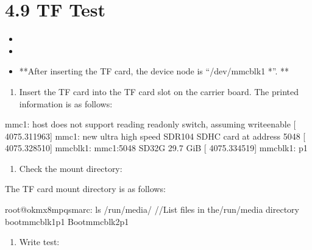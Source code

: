 \documentclass[letterpaper,10pt,openany,english]{sphinxmanual}
\begin{document}
\section{4.9 TF Test}
\label{\detokenize{linux-manual:tf-test}}
\sphinxAtStartPar
{}
\begin{itemize}
\item {} 
\sphinxAtStartPar
{}

\item {} 
\sphinxAtStartPar
{}

\item {} 
\sphinxAtStartPar
**After inserting the TF card, the device node is “/dev/mmcblk1 *”. **

\end{itemize}
\begin{enumerate}
%
\item {} 
\sphinxAtStartPar
Insert the TF card into the TF card slot on the carrier board. The printed information is as follows:

\end{enumerate}

\begin{sphinxVerbatim}[commandchars=\\\{\}]
[ 4075.276047] mmc1: host does not support reading read\PYGZhy{}only switch, assuming write\PYGZhy{}enable
[ 4075.311963] mmc1: new ultra high speed SDR104 SDHC card at address 5048
[ 4075.328510] mmcblk1: mmc1:5048 SD32G 29.7 GiB 
[ 4075.334519]  mmcblk1: p1
\end{sphinxVerbatim}
\begin{enumerate}
%
\setcounter{enumi}{1}
\item {} 
\sphinxAtStartPar
Check the mount directory:

\end{enumerate}

\sphinxAtStartPar
The TF card mount directory is as follows:

\begin{sphinxVerbatim}[commandchars=\\\{\}]
root@ok\PYGZhy{}mx8mpq\PYGZhy{}smarc:\PYGZti{}\PYGZsh{} ls /run/media/               //List files in the/run/media directory
boot\PYGZhy{}mmcblk1p1  Boot\PYGZhy{}mmcblk2p1
\end{sphinxVerbatim}
\begin{enumerate}
%
\setcounter{enumi}{2}
\item {} 
\sphinxAtStartPar
Write test:

\end{enumerate}
\end{document}
